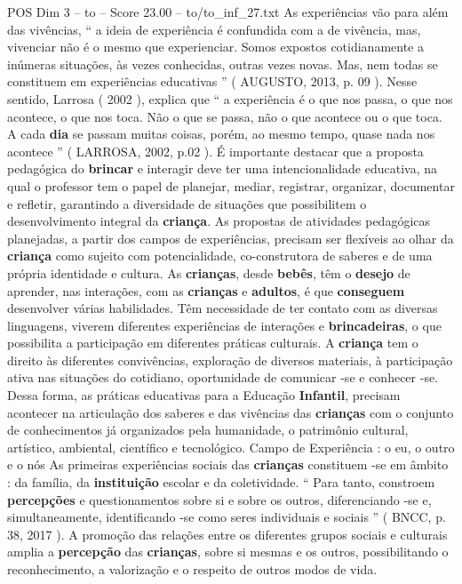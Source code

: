 \begin{textsample}{POS Dim 3 – to – Score 23.00 – to/to\_inf\_27.txt}
As experiências vão para além das vivências, “ a ideia de experiência é confundida com a de vivência, mas, vivenciar não é o mesmo que experienciar.
Somos expostos cotidianamente a inúmeras situações, às vezes conhecidas, outras vezes novas.
Mas, nem todas se constituem em experiências educativas ” ( AUGUSTO, 2013, p. 09 ).
Nesse sentido, Larrosa ( 2002 ), explica que “ a experiência é o que nos passa, o que nos acontece, o que nos toca.
Não o que se passa, não o que acontece ou o que toca.
A cada \textbf{dia} se passam muitas coisas, porém, ao mesmo tempo, quase nada nos acontece ” ( LARROSA, 2002, p.02 ).
É importante destacar que a proposta pedagógica do \textbf{brincar} e interagir deve ter uma intencionalidade educativa, na qual o professor tem o papel de planejar, mediar, registrar, organizar, documentar e refletir, garantindo a diversidade de situações que possibilitem o desenvolvimento integral da \textbf{criança}.
As propostas de atividades pedagógicas planejadas, a partir dos campos de experiências, precisam ser flexíveis ao olhar da \textbf{criança} como sujeito com potencialidade, co-construtora de saberes e de uma própria identidade e cultura.
As \textbf{crianças}, desde \textbf{bebês}, têm o \textbf{desejo} de aprender, nas interações, com as \textbf{crianças} e \textbf{adultos}, é que \textbf{conseguem} desenvolver várias habilidades.
Têm necessidade de ter contato com as diversas linguagens, viverem diferentes experiências de interações e \textbf{brincadeiras}, o que possibilita a participação em diferentes práticas culturais.
A \textbf{criança} tem o direito às diferentes convivências, exploração de diversos materiais, à participação ativa nas situações do cotidiano, oportunidade de comunicar -se e conhecer -se.
Dessa forma, as práticas educativas para a Educação \textbf{Infantil}, precisam acontecer na articulação dos saberes e das vivências das \textbf{crianças} com o conjunto de conhecimentos já organizados pela humanidade, o patrimônio cultural, artístico, ambiental, científico e tecnológico.
Campo de Experiência : o eu, o outro e o nós As primeiras experiências sociais das \textbf{crianças} constituem -se em âmbito : da família, da \textbf{instituição} escolar e da coletividade. “ Para tanto, constroem \textbf{percepções} e questionamentos sobre si e sobre os outros, diferenciando -se e, simultaneamente, identificando -se como seres individuais e sociais ” ( BNCC, p. 38, 2017 ).
A promoção das relações entre os diferentes grupos sociais e culturais amplia a \textbf{percepção} das \textbf{crianças}, sobre si mesmas e os outros, possibilitando o reconhecimento, a valorização e o respeito de outros modos de vida.

\end{textsample}

